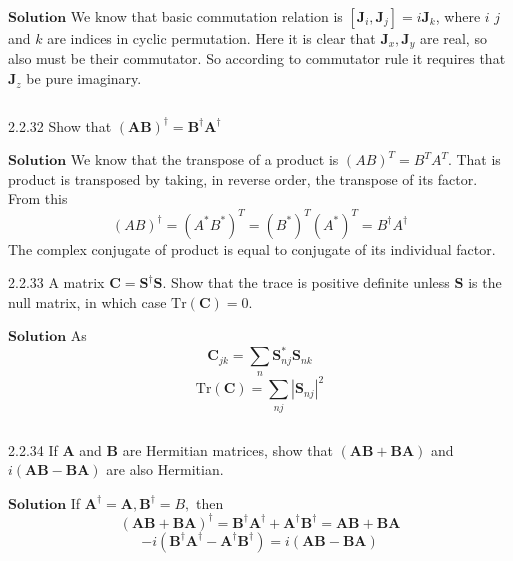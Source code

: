 $\boxed{\textbf{Solution}}$ We know that basic commutation relation is $\left[\mathbf{J}_{i}, \mathbf{J}_{j}\right]=i \mathbf{J}_{k}$, where $i$ $j$ and $k$ are indices in cyclic permutation.
Here it is clear that $\mathbf{J}_{x}, \mathbf{J}_{y}$ are real, so also must be their commutator. So according to
commutator rule it requires that $\mathbf{J}_{z}$ be pure imaginary.

$$$$

\begin{mybox}{2.2.32}
Show that $(\mathbf{A}\mathbf{B})^{\dagger}=\mathbf{B}^{\dagger} \mathbf{A}^{\dagger}$
\end{mybox}



$\boxed{\textbf{Solution}}$ We know that the transpose of a product is $(A B)^{T}=B^{T} A^{T}$. That is product is transposed by
taking, in reverse order, the transpose of its factor.
From this
$$
(A B)^{\dagger}=\left(A^{*} B^{*}\right)^{T}=\left(B^{*}\right)^{T}\left(A^{*}\right)^{T}=B^{\dagger} A^{\dagger}
$$
The complex conjugate of product is equal to conjugate of its individual factor.

\newpage


\begin{mybox}{2.2.33}
A matrix $\mathbf{C}=\mathbf{S}^{\dagger} \mathbf{S}$. Show that the trace is positive definite unless $\mathbf{S}$ is the null matrix, in which case $\text{Tr}(\mathbf{C})=0 .$
\end{mybox}



$\boxed{\textbf{Solution}}$ As
$$\mathbf{C}_{j k}=\sum_{n} \boldsymbol{S}_{n j}^{*} \boldsymbol{S}_{n k}$$
$$\text{Tr}(\mathbf{C})=\sum_{n j}\left|\boldsymbol{S}_{n j}\right|^{2}$$

$$$$

\begin{mybox}{2.2.34}
If $\mathbf{A}$ and $\mathbf{B}$ are Hermitian matrices, show that $(\mathbf{A}\mathbf{B}+\mathbf{BA})$ and $i(\mathbf{A}\mathbf{B}-\mathbf{B}\mathbf{A})$ are also Hermitian.
\end{mybox}

$\boxed{\textbf{Solution}}$  If $\mathbf{A}^{\dagger}=\mathbf{A}, \mathbf{B}^{\dagger}=B,$ then
$$(\mathbf{A}\mathbf{B}+\mathbf{BA})^{\dagger}=\mathbf{B}^{\dagger} \mathbf{A}^{\dagger}+\mathbf{A}^{\dagger} \mathbf{B}^{\dagger}=\mathbf{AB}+\mathbf{BA}$$
$$-i\left(\mathbf{B}^{\dagger} \mathbf{A}^{\dagger}-\mathbf{A}^{\dagger} \mathbf{B}^{\dagger}\right)=i(\mathbf{A}\mathbf{B}-\mathbf{B}\mathbf{A})$$


